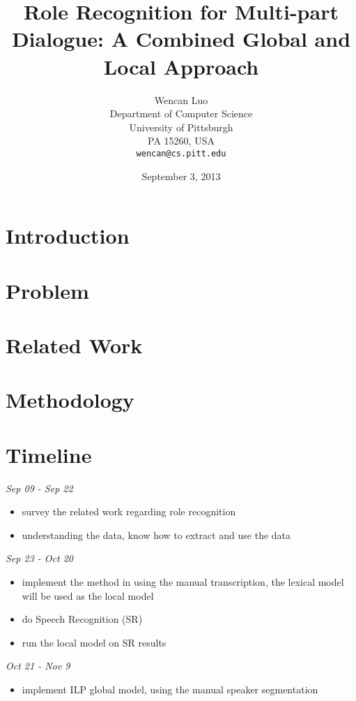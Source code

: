 \documentclass[11pt,letterpaper]{article}
\title{Role Recognition for Multi-part Dialogue: A Combined Global and Local Approach}
\author{Wencan Luo\\
	    Department of Computer Science\\
	    University of Pittsburgh\\
	    PA 15260, USA\\
	    {\tt wencan@cs.pitt.edu}
	  }
\date{September 3, 2013}
\begin{document}
\maketitle
\begin{abstract}
  
\end{abstract}

\section{Introduction}


\section{Problem}


\section{Related Work}

\section{Methodology}

\section{Timeline}

\noindent \emph{Sep 09 - Sep 22}
\begin{itemize}
  \item survey the related work regarding role recognition
  \item understanding the data, know how to extract and use the data
\end{itemize}

\noindent \emph{Sep 23 -  Oct 20}
\begin{itemize}
  \item implement the method in \cite{Garg:2008} using the manual transcription, the lexical model will be used as the local model
  \item do Speech Recognition (SR)
  \item run the local model on SR results
\end{itemize}

\noindent \emph{Oct 21 - Nov 9}
\begin{itemize}
  \item implement ILP global model, using the manual speaker segmentation
\end{itemize}
\end{document}
